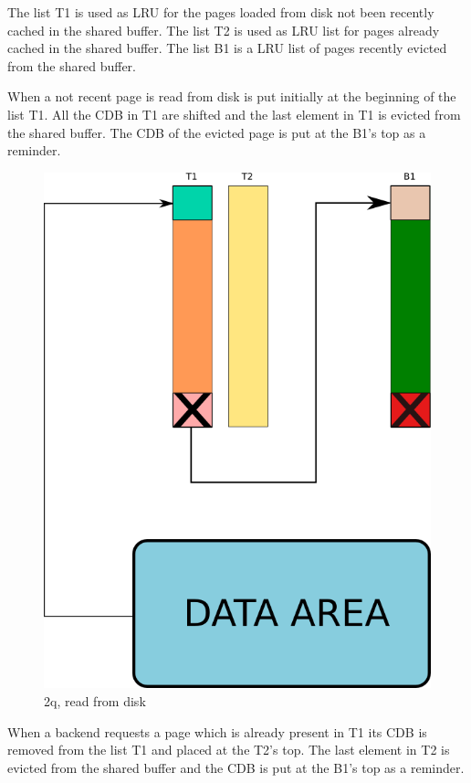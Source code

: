 The list T1 is used as LRU for the pages loaded from disk not been recently cached in the shared buffer. The list T2 is used as LRU list for pages already cached 
in the shared buffer. The list B1 is a LRU list of pages recently evicted from the shared buffer.

When a not recent page is read from disk  is put initially at the beginning of the list T1. All the CDB in T1 are shifted and the 
last element in T1 is evicted from the shared buffer. The CDB of the evicted page is put at the B1's top as a reminder.\newline 

\begin{figure}[H]
\includegraphics[scale=0.4]{images/2q_01.png}

\caption{2q, read from disk}

\end{figure}

When a backend requests a page which is already present in T1 its CDB is removed from the list T1 and placed at the T2's top. The last 
element in T2 is  evicted from the shared buffer and the CDB is put at the B1's top as a reminder.\newline

